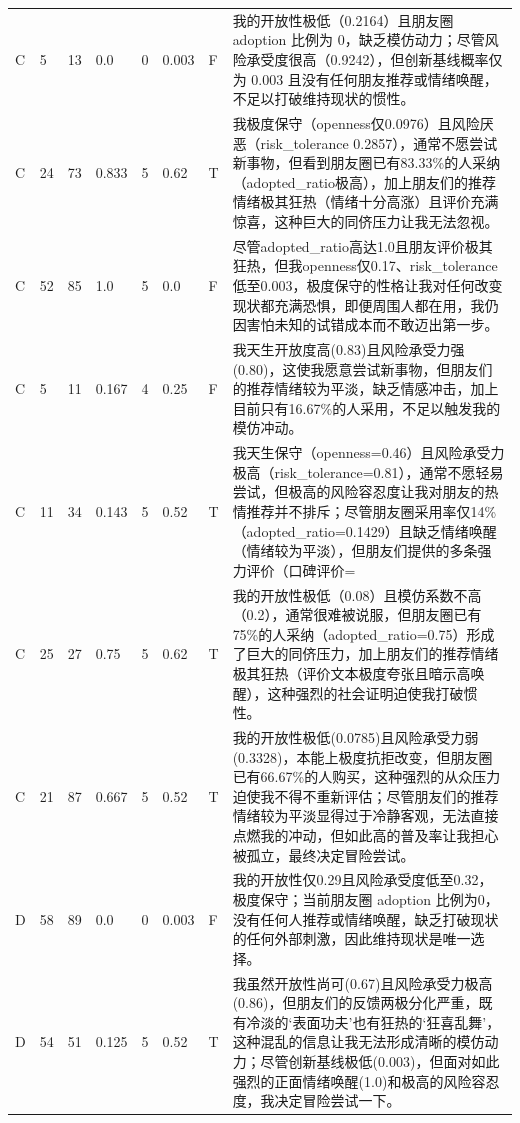 \begin{longtable}{P{0.05\textwidth}P{0.05\textwidth}P{0.07\textwidth}P{0.08\textwidth}P{0.06\textwidth}P{0.06\textwidth}P{0.06\textwidth}P{0.45\textwidth}}
C & 5 & 13 & 0.0 & 0 & 0.003 & F & 我的开放性极低（0.2164）且朋友圈 adoption 比例为 0，缺乏模仿动力；尽管风险承受度很高（0.9242），但创新基线概率仅为 0.003 且没有任何朋友推荐或情绪唤醒，不足以打破维持现状的惯性。 \\
C & 24 & 73 & 0.833 & 5 & 0.62 & T & 我极度保守（openness仅0.0976）且风险厌恶（risk\_tolerance 0.2857），通常不愿尝试新事物，但看到朋友圈已有83.33\%的人采纳（adopted\_ratio极高），加上朋友们的推荐情绪极其狂热（情绪十分高涨）且评价充满惊喜，这种巨大的同侪压力让我无法忽视。 \\
C & 52 & 85 & 1.0 & 5 & 0.0 & F & 尽管adopted\_ratio高达1.0且朋友评价极其狂热，但我openness仅0.17、risk\_tolerance低至0.003，极度保守的性格让我对任何改变现状都充满恐惧，即便周围人都在用，我仍因害怕未知的试错成本而不敢迈出第一步。 \\
C & 5 & 11 & 0.167 & 4 & 0.25 & F & 我天生开放度高(0.83)且风险承受力强(0.80)，这使我愿意尝试新事物，但朋友们的推荐情绪较为平淡，缺乏情感冲击，加上目前只有16.67\%的人采用，不足以触发我的模仿冲动。 \\
C & 11 & 34 & 0.143 & 5 & 0.52 & T & 我天生保守（openness=0.46）且风险承受力极高（risk\_tolerance=0.81），通常不愿轻易尝试，但极高的风险容忍度让我对朋友的热情推荐并不排斥；尽管朋友圈采用率仅14\%（adopted\_ratio=0.1429）且缺乏情绪唤醒（情绪较为平淡），但朋友们提供的多条强力评价（口碑评价= \\
C & 25 & 27 & 0.75 & 5 & 0.62 & T & 我的开放性极低（0.08）且模仿系数不高（0.2），通常很难被说服，但朋友圈已有75\%的人采纳（adopted\_ratio=0.75）形成了巨大的同侪压力，加上朋友们的推荐情绪极其狂热（评价文本极度夸张且暗示高唤醒），这种强烈的社会证明迫使我打破惯性。 \\
C & 21 & 87 & 0.667 & 5 & 0.52 & T & 我的开放性极低(0.0785)且风险承受力弱(0.3328)，本能上极度抗拒改变，但朋友圈已有66.67\%的人购买，这种强烈的从众压力迫使我不得不重新评估；尽管朋友们的推荐情绪较为平淡显得过于冷静客观，无法直接点燃我的冲动，但如此高的普及率让我担心被孤立，最终决定冒险尝试。 \\
D & 58 & 89 & 0.0 & 0 & 0.003 & F & 我的开放性仅0.29且风险承受度低至0.32，极度保守；当前朋友圈 adoption 比例为0，没有任何人推荐或情绪唤醒，缺乏打破现状的任何外部刺激，因此维持现状是唯一选择。 \\
D & 54 & 51 & 0.125 & 5 & 0.52 & T & 我虽然开放性尚可(0.67)且风险承受力极高(0.86)，但朋友们的反馈两极分化严重，既有冷淡的‘表面功夫’也有狂热的‘狂喜乱舞’，这种混乱的信息让我无法形成清晰的模仿动力；尽管创新基线极低(0.003)，但面对如此强烈的正面情绪唤醒(1.0)和极高的风险容忍度，我决定冒险尝试一下。 \\

\end{longtable}
